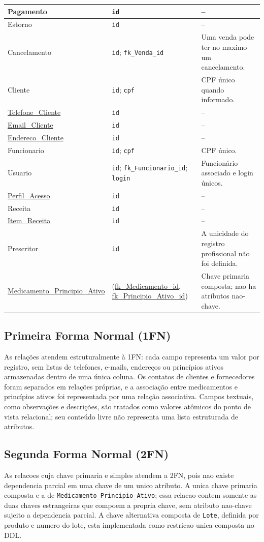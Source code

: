 \documentclass[12pt,a4paper]{article}
\begin{document}
\begin{longtable}{|L{3.5cm}|L{6.0cm}|L{5.2cm}|}
Pagamento & \texttt{id} & --\\\hline
Estorno & \texttt{id} & --\\\hline
Cancelamento & \texttt{id}; \texttt{fk\_Venda\_id} & Uma venda pode ter no maximo um cancelamento.\\\hline
Cliente & \texttt{id}; \texttt{cpf} & CPF único quando informado.\\\hline
\url{Telefone_Cliente} & \texttt{id} & --\\\hline
\url{Email_Cliente} & \texttt{id} & --\\\hline
\url{Endereco_Cliente} & \texttt{id} & --\\\hline
Funcionario & \texttt{id}; \texttt{cpf} & CPF único.\\\hline
Usuario & \texttt{id}; \texttt{fk\_Funcionario\_id}; \texttt{login} & Funcionário associado e login únicos.\\\hline
\url{Perfil_Acesso} & \texttt{id} & --\\\hline
Receita & \texttt{id} & --\\\hline
\url{Item_Receita} & \texttt{id} & --\\\hline
Prescritor & \texttt{id} & A unicidade do registro profissional não foi definida.\\\hline
\url{Medicamento_Principio_Ativo} & (\url{fk_Medicamento_id}, \url{fk_Principio_Ativo_id}) & Chave primaria composta; nao ha atributos nao-chave.\\\hline
\end{longtable}
\endgroup

\subsection{Primeira Forma Normal (1FN)}
As relações atendem estruturalmente à 1FN: cada campo representa um valor por registro, sem listas de telefones, e-mails, endereços ou princípios ativos armazenadas dentro de uma única coluna. Os contatos de clientes e fornecedores foram separados em relações próprias, e a associação entre medicamentos e princípios ativos foi representada por uma relação associativa. Campos textuais, como observações e descrições, são tratados como valores atômicos do ponto de vista relacional; seu conteúdo livre não representa uma lista estruturada de atributos.

\subsection{Segunda Forma Normal (2FN)}
As relacoes cuja chave primaria e simples atendem a 2FN, pois nao existe dependencia parcial em uma chave de um unico atributo. A unica chave primaria composta e a de \texttt{Medicamento\_Principio\_Ativo}; essa relacao contem somente as duas chaves estrangeiras que compoem a propria chave, sem atributo nao-chave sujeito a dependencia parcial. A chave alternativa composta de \texttt{Lote}, definida por produto e numero do lote, esta implementada como restricao unica composta no DDL.
\end{document}

